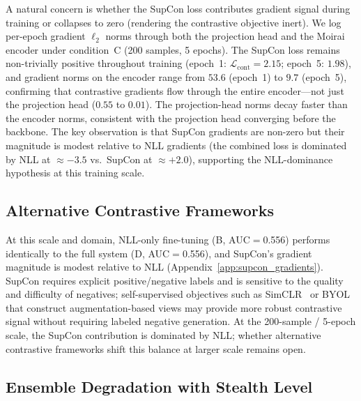 A natural concern is whether the SupCon loss contributes gradient signal
during training or collapses to zero (rendering the contrastive objective inert).
We log per-epoch gradient $\ell_2$ norms through both the projection head and the
Moirai encoder under condition~C (200 samples, 5 epochs).
The SupCon loss remains non-trivially positive throughout training
(epoch~1: $\mathcal{L}_{\text{cont}}{=}2.15$; epoch~5: $1.98$), and gradient
norms on the encoder range from $53.6$ (epoch~1) to $9.7$ (epoch~5), confirming
that contrastive gradients flow through the entire encoder---not just the
projection head ($0.55$ to $0.01$).
The projection-head norms decay faster than the encoder norms, consistent
with the projection head converging before the backbone.
The key observation is that SupCon gradients are non-zero but their magnitude
is modest relative to NLL gradients (the combined loss is dominated by NLL at
$\approx{-}3.5$ vs.\ SupCon at $\approx{+}2.0$), supporting the
NLL-dominance hypothesis at this training scale.

\subsection{Alternative Contrastive Frameworks}
\label{app:alt_contrastive}

At this scale and domain, NLL-only fine-tuning (B, AUC$=$0.556) performs
identically to the full system (D, AUC$=$0.556), and SupCon's gradient
magnitude is modest relative to NLL (Appendix~\ref{app:supcon_gradients}).
SupCon requires explicit positive/negative labels and is sensitive to
the quality and difficulty of negatives; self-supervised objectives
such as SimCLR~\cite{chen2020simclr} or BYOL~\cite{grill2020byol} that
construct augmentation-based views may provide more robust contrastive
signal without requiring labeled negative generation.
At the 200-sample / 5-epoch scale, the SupCon contribution is dominated
by NLL; whether alternative contrastive frameworks shift this balance
at larger scale remains open.

\subsection{Ensemble Degradation with Stealth Level}
\label{app:ensemble_degradation}

